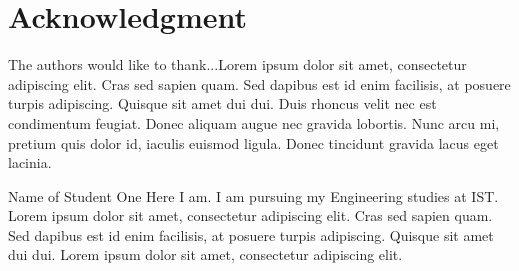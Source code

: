 \documentclass[a4paper,12pt,journal,twoside,compsoc]{PPIEEEtran}
\begin{document}
  \section*{} %
\else
  \section*{Acknowledgment}
\fi

The authors would like to thank...Lorem ipsum dolor sit amet, consectetur adipiscing elit. Cras sed sapien quam. Sed dapibus est id enim facilisis, at posuere turpis adipiscing. Quisque sit amet dui dui.
Duis rhoncus velit nec est condimentum feugiat. Donec aliquam augue nec gravida lobortis. Nunc arcu mi, pretium quis dolor id, iaculis euismod ligula. Donec tincidunt gravida lacus eget lacinia.


%

% 

\begin{IEEEbiography}{Name of Student One}
Here I am. I am pursuing my Engineering studies at \ac{IST}. Lorem ipsum dolor sit amet, consectetur adipiscing elit. Cras sed sapien quam. Sed dapibus est id enim facilisis, at posuere turpis adipiscing. Quisque sit amet dui dui. Lorem ipsum dolor sit amet, consectetur adipiscing elit. 
\end{IEEEbiography}
\end{document}
